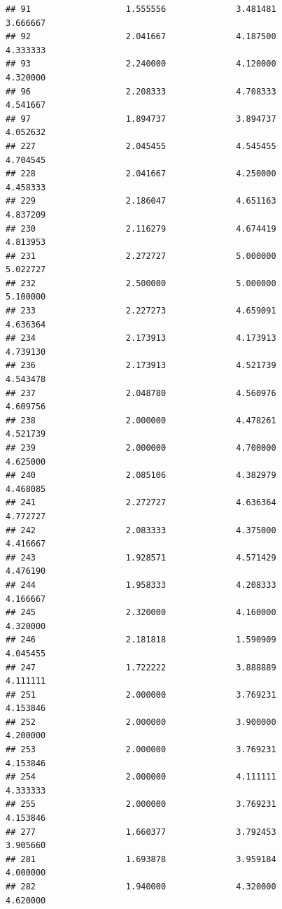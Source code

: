 \documentclass[]{article}
\begin{document}
\begin{verbatim}
## 91                   1.555556              3.481481                3.666667
## 92                   2.041667              4.187500                4.333333
## 93                   2.240000              4.120000                4.320000
## 96                   2.208333              4.708333                4.541667
## 97                   1.894737              3.894737                4.052632
## 227                  2.045455              4.545455                4.704545
## 228                  2.041667              4.250000                4.458333
## 229                  2.186047              4.651163                4.837209
## 230                  2.116279              4.674419                4.813953
## 231                  2.272727              5.000000                5.022727
## 232                  2.500000              5.000000                5.100000
## 233                  2.227273              4.659091                4.636364
## 234                  2.173913              4.173913                4.739130
## 236                  2.173913              4.521739                4.543478
## 237                  2.048780              4.560976                4.609756
## 238                  2.000000              4.478261                4.521739
## 239                  2.000000              4.700000                4.625000
## 240                  2.085106              4.382979                4.468085
## 241                  2.272727              4.636364                4.772727
## 242                  2.083333              4.375000                4.416667
## 243                  1.928571              4.571429                4.476190
## 244                  1.958333              4.208333                4.166667
## 245                  2.320000              4.160000                4.320000
## 246                  2.181818              1.590909                4.045455
## 247                  1.722222              3.888889                4.111111
## 251                  2.000000              3.769231                4.153846
## 252                  2.000000              3.900000                4.200000
## 253                  2.000000              3.769231                4.153846
## 254                  2.000000              4.111111                4.333333
## 255                  2.000000              3.769231                4.153846
## 277                  1.660377              3.792453                3.905660
## 281                  1.693878              3.959184                4.000000
## 282                  1.940000              4.320000                4.620000

\end{verbatim}
\end{document}
